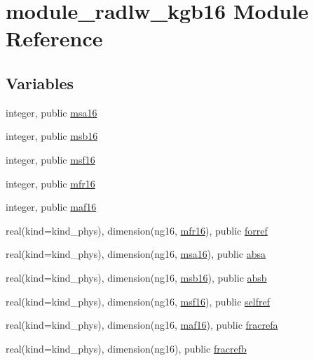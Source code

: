 \hypertarget{namespacemodule__radlw__kgb16}{}\section{module\+\_\+radlw\+\_\+kgb16 Module Reference}
\label{namespacemodule__radlw__kgb16}
\subsection*{Variables}
\begin{DoxyCompactItemize}
\item 
integer, public \hyperlink{namespacemodule__radlw__kgb16_a95bf5395b579ca6619de3fc40c7ded79}{msa16}
\item 
integer, public \hyperlink{group__module__radlw__main_ga18ad5b461d6c71b1aa2d82d5694beb03}{msb16}
\item 
integer, public \hyperlink{group__module__radlw__main_ga8601911604c1d6a1b32e434159ae95d2}{msf16}
\item 
integer, public \hyperlink{group__module__radlw__main_ga82777667b951207c62955e3e1492d79d}{mfr16}
\item 
integer, public \hyperlink{group__module__radlw__main_gaae4c96f4a2ae49c573189f2d63ccd4a3}{maf16}
\item 
real(kind=kind\+\_\+phys), dimension(ng16, \hyperlink{group__module__radlw__main_ga82777667b951207c62955e3e1492d79d}{mfr16}), public \hyperlink{group__module__radlw__main_ga4402ed68e18459813a6c9ede5d6ba9cc}{forref}
\item 
real(kind=kind\+\_\+phys), dimension(ng16, \hyperlink{namespacemodule__radlw__kgb16_a95bf5395b579ca6619de3fc40c7ded79}{msa16}), public \hyperlink{group__module__radlw__main_ga2734b420b7e8e8393a8bf1b595a3cf09}{absa}
\item 
real(kind=kind\+\_\+phys), dimension(ng16, \hyperlink{group__module__radlw__main_ga18ad5b461d6c71b1aa2d82d5694beb03}{msb16}), public \hyperlink{group__module__radlw__main_gae856b42252b71d4d588ea5e19e871cac}{absb}
\item 
real(kind=kind\+\_\+phys), dimension(ng16, \hyperlink{group__module__radlw__main_ga8601911604c1d6a1b32e434159ae95d2}{msf16}), public \hyperlink{group__module__radlw__main_gafaa2554e1161bd6c983ce630d39d703a}{selfref}
\item 
real(kind=kind\+\_\+phys), dimension(ng16, \hyperlink{group__module__radlw__main_gaae4c96f4a2ae49c573189f2d63ccd4a3}{maf16}), public \hyperlink{group__module__radlw__main_ga355dcc9f6f4955ab3d7ee0a22005c8ba}{fracrefa}
\item 
real(kind=kind\+\_\+phys), dimension(ng16), public \hyperlink{group__module__radlw__main_gab93affafac8e2bb182982133a6449de4}{fracrefb}
\end{DoxyCompactItemize}


